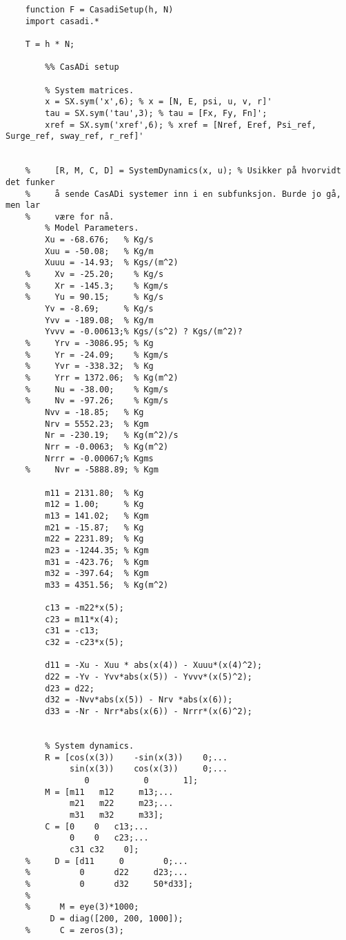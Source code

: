 \begin{lstlisting}
    function F = CasadiSetup(h, N)
    import casadi.*
    
    T = h * N;
    
        %% CasADi setup
        
        % System matrices.
        x = SX.sym('x',6); % x = [N, E, psi, u, v, r]'
        tau = SX.sym('tau',3); % tau = [Fx, Fy, Fn]';
        xref = SX.sym('xref',6); % xref = [Nref, Eref, Psi_ref, Surge_ref, sway_ref, r_ref]'
        
        
    %     [R, M, C, D] = SystemDynamics(x, u); % Usikker på hvorvidt det funker
    %     å sende CasADi systemer inn i en subfunksjon. Burde jo gå, men lar
    %     være for nå.
        % Model Parameters.
        Xu = -68.676;   % Kg/s
        Xuu = -50.08;   % Kg/m
        Xuuu = -14.93;  % Kgs/(m^2)
    %     Xv = -25.20;    % Kg/s
    %     Xr = -145.3;    % Kgm/s
    %     Yu = 90.15;     % Kg/s
        Yv = -8.69;     % Kg/s
        Yvv = -189.08;  % Kg/m
        Yvvv = -0.00613;% Kgs/(s^2) ? Kgs/(m^2)?
    %     Yrv = -3086.95; % Kg
    %     Yr = -24.09;    % Kgm/s
    %     Yvr = -338.32;  % Kg
    %     Yrr = 1372.06;  % Kg(m^2)
    %     Nu = -38.00;    % Kgm/s
    %     Nv = -97.26;    % Kgm/s
        Nvv = -18.85;   % Kg
        Nrv = 5552.23;  % Kgm
        Nr = -230.19;   % Kg(m^2)/s
        Nrr = -0.0063;  % Kg(m^2)
        Nrrr = -0.00067;% Kgms
    %     Nvr = -5888.89; % Kgm
        
        m11 = 2131.80;  % Kg
        m12 = 1.00;     % Kg
        m13 = 141.02;   % Kgm
        m21 = -15.87;   % Kg
        m22 = 2231.89;  % Kg
        m23 = -1244.35; % Kgm
        m31 = -423.76;  % Kgm
        m32 = -397.64;  % Kgm
        m33 = 4351.56;  % Kg(m^2)
        
        c13 = -m22*x(5);
        c23 = m11*x(4);
        c31 = -c13;
        c32 = -c23*x(5);
        
        d11 = -Xu - Xuu * abs(x(4)) - Xuuu*(x(4)^2);
        d22 = -Yv - Yvv*abs(x(5)) - Yvvv*(x(5)^2);
        d23 = d22;
        d32 = -Nvv*abs(x(5)) - Nrv *abs(x(6));
        d33 = -Nr - Nrr*abs(x(6)) - Nrrr*(x(6)^2);
        
        
        % System dynamics.
        R = [cos(x(3))    -sin(x(3))    0;...
             sin(x(3))    cos(x(3))     0;...
                0           0       1];    
        M = [m11   m12     m13;...
             m21   m22     m23;...
             m31   m32     m33];
        C = [0    0   c13;...
             0    0   c23;...
             c31 c32    0];
    %     D = [d11     0        0;...
    %          0      d22     d23;...
    %          0      d32     50*d33];
    % 
    %      M = eye(3)*1000;
         D = diag([200, 200, 1000]);
    %      C = zeros(3);
        

\end{lstlisting}
